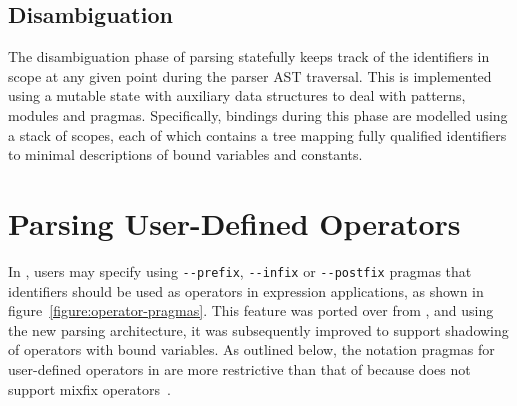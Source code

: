 
\subsection{Disambiguation}

The disambiguation phase of parsing statefully keeps track of the identifiers in scope at any given point during the parser \ac{AST} traversal.
This is implemented using a mutable state with auxiliary data structures to deal with patterns, modules and pragmas.
Specifically, bindings during this phase are modelled using a stack of scopes, each of which contains a tree mapping fully qualified identifiers to minimal descriptions of bound variables and constants.


\section{Parsing User-Defined Operators}

In \Beluga, users may specify using \verb|--prefix|, \verb|--infix| or \verb|--postfix| pragmas that identifiers should be used as operators in expression applications, as shown in figure~\ref{figure:operator-pragmas}.
This feature was ported over from \Twelf, and using the new parsing architecture, it was subsequently improved to support shadowing of operators with bound variables.
As outlined below, the notation pragmas for user-defined operators in \Beluga are more restrictive than that of \Agda because \Beluga does not support mixfix operators~\cite{danielsson2008parsing}.

